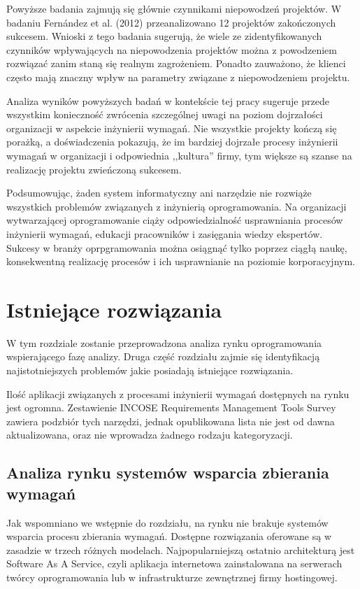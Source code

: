   Powyższe badania zajmują się głównie czynnikami niepowodzeń projektów. W badaniu Fern\'{a}ndez et al. (2012) przeanalizowano 12 projektów zakończonych sukcesem. Wnioski z tego badania sugerują, że wiele ze zidentyfikowanych czynników wpływających na niepowodzenia projektów można z powodzeniem rozwiązać zanim staną się realnym zagrożeniem. Ponadto zauważono, że klienci często mają znaczny wpływ na parametry związane z niepowodzeniem projektu. 

  Analiza wyników powyższych badań w kontekście tej pracy sugeruje przede wszystkim konieczność zwrócenia szczególnej uwagi na poziom dojrzałości organizacji w aspekcie inżynierii wymagań. Nie wszystkie projekty kończą się porażką, a doświadczenia pokazują, że im bardziej dojrzałe procesy inżynierii wymagań w organizacji i odpowiednia ,,kultura'' firmy, tym większe są szanse na realizację projektu zwieńczoną sukcesem. 

  Podsumowując, żaden system informatyczny ani narzędzie nie rozwiąże wszystkich problemów związanych z inżynierią oprogramowania. Na organizacji wytwarzającej oprogramowanie ciąży odpowiedzialność usprawniania procesów inżynierii wymagań, edukacji pracowników i zasięgania wiedzy ekspertów. Sukcesy w branży oprpgramowania można osiągnąć tylko poprzez ciągłą naukę, konsekwentną realizację procesów i ich usprawnianie na poziomie korporacyjnym.

\chapter{Istniejące rozwiązania}


  W tym rozdziale zostanie przeprowadzona analiza rynku oprogramowania wspierającego fazę analizy. Druga część rozdziału zajmie się identyfikacją najistotniejszych problemów jakie posiadają istniejące rozwiązania. 

  Ilość aplikacji związanych z procesami inżynierii wymagań dostępnych na rynku jest ogromna. Zestawienie INCOSE Requirements Management Tools Survey \cite{Incose} zawiera podzbiór tych narzędzi, jednak opublikowana lista nie jest od dawna aktualizowana, oraz nie wprowadza żadnego rodzaju kategoryzacji. 

  \section{Analiza rynku systemów wsparcia zbierania wymagań}

    Jak wspomniano we wstępnie do rozdziału, na rynku nie brakuje systemów wsparcia procesu zbierania wymagań. Dostępne rozwiązania oferowane są w zasadzie w trzech różnych modelach. Najpopularniejszą ostatnio architekturą jest Software As A Service, czyli aplikacja internetowa zainstalowana na serwerach twórcy oprogramowania lub w infrastrukturze zewnętrznej firmy hostingowej. 
    
